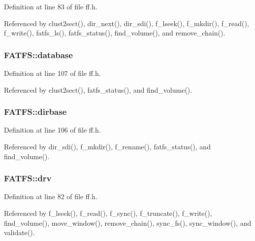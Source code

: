Definition at line 83 of file ff.\-h.



Referenced by clust2sect(), dir\-\_\-next(), dir\-\_\-sdi(), f\-\_\-lseek(), f\-\_\-mkdir(), f\-\_\-read(), f\-\_\-write(), fatfs\-\_\-ls(), fatfs\-\_\-status(), find\-\_\-volume(), and remove\-\_\-chain().

\hypertarget{structFATFS_a5b6c0bc2e9fd2ae8ef714210a74a2d5d}{
\subsubsection[{database}]{ F\-A\-T\-F\-S\-::database}}\label{structFATFS_a5b6c0bc2e9fd2ae8ef714210a74a2d5d}


Definition at line 107 of file ff.\-h.



Referenced by clust2sect(), fatfs\-\_\-status(), and find\-\_\-volume().

\hypertarget{structFATFS_a3f72fd998dbcce4652a85a81fe944bc4}{
\subsubsection[{dirbase}]{ F\-A\-T\-F\-S\-::dirbase}}\label{structFATFS_a3f72fd998dbcce4652a85a81fe944bc4}


Definition at line 106 of file ff.\-h.



Referenced by dir\-\_\-sdi(), f\-\_\-mkdir(), f\-\_\-rename(), fatfs\-\_\-status(), and find\-\_\-volume().

\hypertarget{structFATFS_a6a791560e2687e8b1569bfce61208d2d}{
\subsubsection[{drv}]{ F\-A\-T\-F\-S\-::drv}}\label{structFATFS_a6a791560e2687e8b1569bfce61208d2d}


Definition at line 82 of file ff.\-h.



Referenced by f\-\_\-lseek(), f\-\_\-read(), f\-\_\-sync(), f\-\_\-truncate(), f\-\_\-write(), find\-\_\-volume(), move\-\_\-window(), remove\-\_\-chain(), sync\-\_\-fs(), sync\-\_\-window(), and validate().

